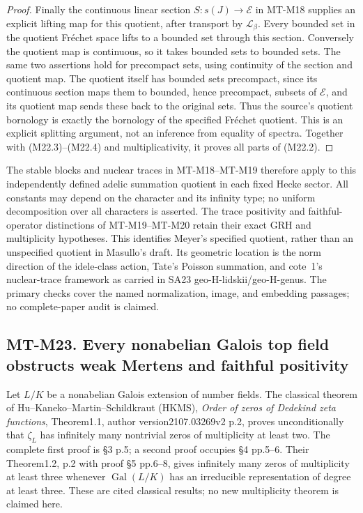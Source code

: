 \begin{proof}
Finally the continuous linear section
\(S:s(J)\to\mathcal E\) in MT-M18 supplies
an explicit lifting map for this quotient,
after transport by \(\mathcal L_\beta\).
Every bounded set in the quotient
Fr\'echet space lifts to a bounded set
through this section.  Conversely the
quotient map is continuous, so it takes
bounded sets to bounded sets.
The same two assertions hold for
precompact sets, using continuity of
the section and quotient map.
The quotient itself has bounded sets
precompact, since its continuous section
maps them to bounded, hence precompact,
subsets of \(\mathcal E\), and its
quotient map sends these back to the
original sets.
Thus the source's quotient bornology
is exactly the bornology of the specified
Fr\'echet quotient.  This is an explicit
splitting argument, not an inference
from equality of spectra.
Together with (M22.3)--(M22.4) and
multiplicativity, it proves all parts
of (M22.2).
\end{proof}

The stable blocks and nuclear traces in
MT-M18--MT-M19 therefore apply to this
independently defined adelic summation
quotient in each fixed Hecke sector.
All constants may depend on the character
and its infinity type; no uniform
decomposition over all characters is
asserted.  The trace positivity and
faithful-operator distinctions of
MT-M19--MT-M20 retain their exact GRH
and multiplicity hypotheses.
This identifies Meyer's specified
quotient, rather than an unspecified
quotient in Masullo's draft.
Its geometric location is the norm
direction of the idele-class action,
Tate's Poisson summation, and cote~1's
nuclear-trace framework as carried in
SA23 geo-H-lidskii/geo-H-genus.
The primary checks cover the named
normalization, image, and embedding
passages; no complete-paper audit
is claimed.


\subsection*{MT-M23. Every nonabelian Galois top field obstructs weak Mertens and faithful positivity}

Let $L/K$ be a nonabelian Galois extension of number fields. The
classical theorem of Hu--Kaneko--Martin--Schildkraut (HKMS),
\emph{Order of zeros of Dedekind zeta functions}, Theorem1.1,
author version2107.03269v2 p.2, proves unconditionally that
$\zeta_L$ has infinitely many nontrivial zeros of multiplicity
at least two. The complete first proof is \S3 p.5; a second
proof occupies \S4 pp.5--6. Their Theorem1.2, p.2 with proof
\S5 pp.6--8, gives infinitely many zeros of multiplicity at
least three whenever $\operatorname{Gal}(L/K)$ has an irreducible
representation of degree at least three. These are cited classical
results; no new multiplicity theorem is claimed here.

